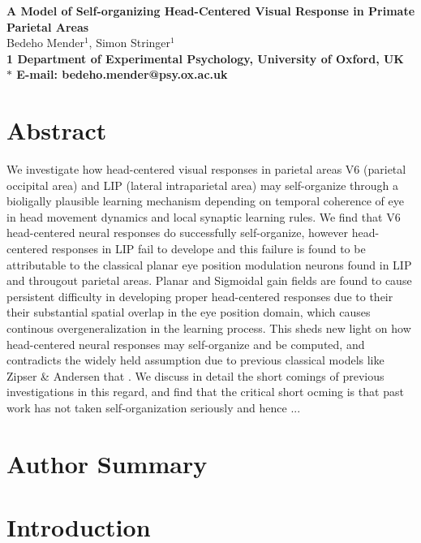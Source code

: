\documentclass[10pt]{article}
\date{}
\begin{document}
\begin{flushleft}
{\Large
\textbf{A Model of Self-organizing Head-Centered Visual Response in Primate Parietal Areas}
}
\\
Bedeho Mender$^{1}$, 
Simon Stringer$^{1}$
\\
\bf{1} Department of Experimental Psychology, University of Oxford, UK
\\
$\ast$ E-mail: bedeho.mender@psy.ox.ac.uk
\end{flushleft}

\section*{Abstract}
We investigate how head-centered visual responses in parietal areas V6 (parietal occipital area) and LIP (lateral intraparietal area)  may self-organize through a bioligally plausible learning mechanism depending on temporal coherence of eye in head movement dynamics and local synaptic learning rules. We find that V6 head-centered neural responses do successfully self-organize, however head-centered responses in LIP fail to develope and this failure is found to be attributable to the classical planar eye position modulation neurons found in LIP and througout parietal areas. Planar and Sigmoidal gain fields are found to cause persistent difficulty in developing proper head-centered responses due to their their substantial spatial overlap in the eye position domain, which causes continous overgeneralization in the learning process. This sheds new light on how head-centered neural responses may self-organize and be computed, and contradicts the widely held assumption due to previous classical models like Zipser \& Andersen that . We discuss in detail the short comings of previous investigations in this regard, and find that the critical short ocming is that past work has not taken self-organization seriously and hence ...

\section*{Author Summary}

\section*{Introduction}
\end{document}
